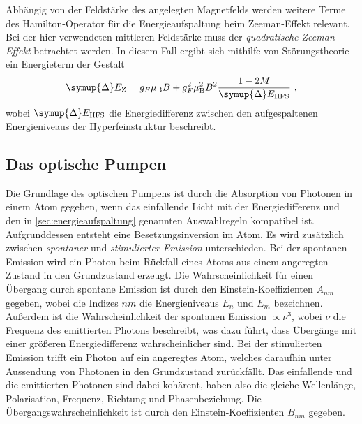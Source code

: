     Abhängig von der Feldstärke des angelegten Magnetfelds werden weitere Terme des Hamilton-Operator für die Energieaufspaltung beim Zeeman-Effekt relevant.
    Bei der hier verwendeten mittleren Feldstärke muss der \textit{quadratische Zeeman-Effekt} betrachtet werden.
    In diesem Fall ergibt sich mithilfe von Störungstheorie ein Energieterm der Gestalt
    \begin{equation}
        \symup{\Delta}E_\text{Z} = g_F \mu_\text{B} B + g^2_F \mu^2_\text{B} B^2 \frac{1 - 2M}{\symup{\Delta}E_\text{HFS}} \ ,
        \label{eqn:quadr_zeeman}
    \end{equation}
    wobei $\symup{\Delta}E_\text{HFS}$ die Energiedifferenz zwischen den aufgespaltenen Energieniveaus der Hyperfeinstruktur beschreibt.


\subsection{Das optische Pumpen}
\label{sec:optisches_pumpen}

    Die Grundlage des optischen Pumpens ist durch die Absorption von Photonen in einem Atom gegeben,
    wenn das einfallende Licht mit der Energiedifferenz und den in \autoref{sec:energieaufspaltung} genannten Auswahlregeln kompatibel ist.
    Aufgrunddessen entsteht eine Besetzungsinversion im Atom.
    Es wird zusätzlich zwischen \textit{spontaner} und \textit{stimulierter Emission} unterschieden.
    Bei der spontanen Emission wird ein Photon beim Rückfall eines Atoms aus einem angeregten Zustand in den Grundzustand erzeugt.
    Die Wahrscheinlichkeit für einen Übergang durch spontane Emission ist durch den Einstein-Koeffizienten $A_{nm}$ gegeben,
    wobei die Indizes $nm$ die Energieniveaus $E_n$ und $E_m$ bezeichnen.
    Außerdem ist die Wahrscheinlichkeit der spontanen Emission $\propto \nu^3$,
    wobei $\nu$ die Frequenz des emittierten Photons beschreibt,
    was dazu führt,
    dass Übergänge mit einer größeren Energiedifferenz wahrscheinlicher sind.
    Bei der stimulierten Emission trifft ein Photon auf ein angeregtes Atom,
    welches daraufhin unter Aussendung von Photonen in den Grundzustand zurückfällt.
    Das einfallende und die emittierten Photonen sind dabei kohärent,
    haben also die gleiche Wellenlänge, Polarisation, Frequenz, Richtung und Phasenbeziehung.
    Die Übergangswahrscheinlichkeit ist durch den Einstein-Koeffizienten $B_{nm}$ gegeben.

